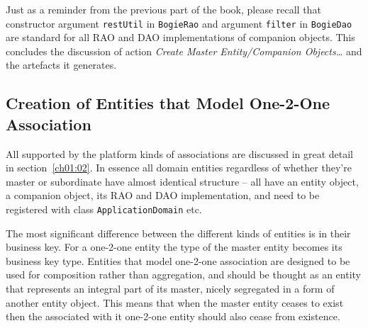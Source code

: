   Just as a reminder from the previous part of the book, please recall that constructor argument \texttt{restUtil} in \texttt{BogieRao} and argument \texttt{filter} in \texttt{BogieDao} are standard for all RAO and DAO implementations of companion objects.
  This concludes the discussion of action \emph{Create Master Entity/Companion Objects\ldots} and the artefacts it generates.
 

  \subsection{Creation of Entities that Model One-2-One Association}  
 
  All supported by the platform kinds of associations are discussed in great detail in section~\ref{ch01:02}.
  In essence all domain entities regardless of whether they're master or subordinate have almost identical structure -- all have an entity object, a companion object, its RAO and DAO implementation, and need to be registered with class \texttt{ApplicationDomain} etc.
  
  The most significant difference between the different kinds of entities is in their business key.
  For a one-2-one entity the type of the master entity becomes its business key type.
  Entities that model one-2-one association are designed to be used for composition rather than aggregation, and should be thought as an entity that represents an integral part of its master, nicely segregated in a form of another entity object.
  This means that when the master entity ceases to exist then the associated with it one-2-one entity should also cease from existence.  

